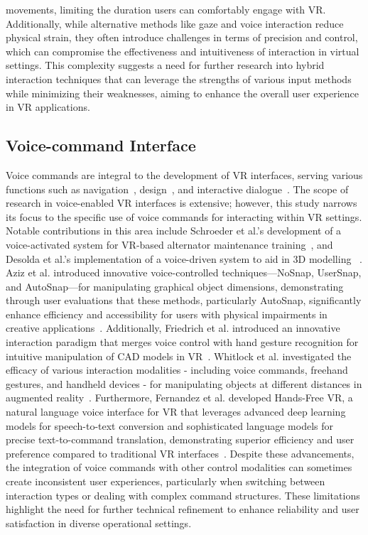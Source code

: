 movements, limiting the duration users can comfortably engage with VR. Additionally, while alternative methods like gaze and voice interaction reduce physical strain, they often introduce challenges in terms of precision and control, which can compromise the effectiveness and intuitiveness of interaction in virtual settings. This complexity suggests a need for further research into hybrid interaction techniques that can leverage the strengths of various input methods while minimizing their weaknesses, aiming to enhance the overall user experience in VR applications.


\subsection{Voice-command Interface}
Voice commands are integral to the development of VR interfaces, serving various functions such as navigation~\cite{hombeck2023tell}, design~\cite{morotti2020fostering}, and interactive dialogue~\cite{gobl2021conversational}. The scope of research in voice-enabled VR interfaces is extensive; however, this study narrows its focus to the specific use of voice commands for interacting within VR settings. Notable contributions in this area include Schroeder et al.'s development of a voice-activated system for VR-based alternator maintenance training~\cite{schroeder2017presence}, and Desolda et al.'s implementation of a voice-driven system to aid in 3D modelling ~\cite{desolda2023digital}. Aziz et al. introduced innovative voice-controlled techniques—NoSnap, UserSnap, and AutoSnap—for manipulating graphical object dimensions, demonstrating through user evaluations that these methods, particularly AutoSnap, significantly enhance efficiency and accessibility for users with physical impairments in creative applications~\cite{aziz2022voice}. Additionally, Friedrich et al. introduced an innovative interaction paradigm that merges voice control with hand gesture recognition for intuitive manipulation of CAD models in VR~\cite{friedrich2021combining}. Whitlock et al. investigated the efficacy of various interaction modalities - including voice commands, freehand gestures, and handheld devices - for manipulating objects at different distances in augmented reality~\cite{whitlock2018interacting}. Furthermore, Fernandez et al. developed Hands-Free VR, a natural language voice interface for VR that leverages advanced deep learning models for speech-to-text conversion and sophisticated language models for precise text-to-command translation, demonstrating superior efficiency and user preference compared to traditional VR interfaces~\cite{fernandez2024hands}. Despite these advancements, the integration of voice commands with other control modalities can sometimes create inconsistent user experiences, particularly when switching between interaction types or dealing with complex command structures. These limitations highlight the need for further technical refinement to enhance reliability and user satisfaction in diverse operational settings. 

